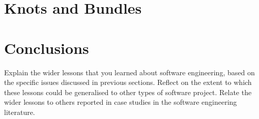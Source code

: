 \documentclass{l3proj}
\begin{document}
\section{Knots and Bundles}
\label{sec:managing}


\section{Conclusions}

Explain the wider lessons that you learned about software engineering,
based on the specific issues discussed in previous sections. Reflect
on the extent to which these lessons could be generalised to other
types of software project. Relate the wider lessons to others
reported in case studies in the software engineering literature.



\end{document}
